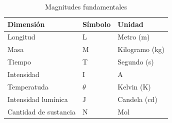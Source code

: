 \begin{table}[H]
\centering

\caption{Magnitudes fundamentales}
\label{tab:magnitudes_fundamentales}
    
\begin{threeparttable}{\small{}
\begin{tabular}{M{0.35\textwidth}M{0.25\textwidth}M{0.25\textwidth}} \hline
    
    \bfseries{Dimensión} & \textbf{Símbolo} & \textbf{Unidad} \\ \hline

    Longitud              & L        & Metro     (\unit{m})         \\ 
    Masa                  & M        & Kilogramo (\unit{kg})        \\ 
    Tiempo                & T        & Segundo   (\unit{s})         \\ 
    Intensidad            & I        & A                            \\ 
    Temperatuda           & $\theta$ & Kelvin    (\unit{\kelvin})   \\ 
    Intensidad lumínica   & J        & Candela   (\unit{\candela})  \\ 
    Cantidad de sustancia & N        & Mol                          \\ 
    
    \hline
\end{tabular}}

\begin{tablenotes} %
    \item[] 
\end{tablenotes}

\end{threeparttable}\end{table}